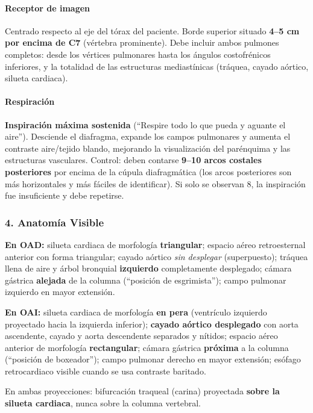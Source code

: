 		\paragraph{Receptor de imagen}
		Centrado respecto al eje del tórax del paciente. Borde superior situado
		\textbf{4--5 cm por encima de C7} (vértebra prominente). Debe incluir ambos pulmones completos:
		desde los vértices pulmonares hasta los ángulos costofrénicos inferiores, y la totalidad de
		las estructuras mediastínicas (tráquea, cayado aórtico, silueta cardiaca).
		
		\paragraph{Respiración}
		\textbf{Inspiración máxima sostenida} (``Respire todo lo que pueda y aguante el aire'').
		Desciende el diafragma, expande los campos pulmonares y aumenta el contraste aire/tejido blando,
		mejorando la visualización del parénquima y las estructuras vasculares. Control: deben contarse
		\textbf{9--10 arcos costales posteriores} por encima de la cúpula diafragmática (los arcos
		posteriores son más horizontales y más fáciles de identificar). Si solo se observan 8,
		la inspiración fue insuficiente y debe repetirse.
		
		\subsubsection*{4. Anatomía Visible}
		
		\textbf{En OAD:} silueta cardiaca de morfología \textbf{triangular}; espacio aéreo
		retroesternal anterior con forma triangular; cayado aórtico \textit{sin desplegar}
		(superpuesto); tráquea llena de aire y árbol bronquial \textbf{izquierdo} completamente
		desplegado; cámara gástrica \textbf{alejada} de la columna (``posición de esgrimista'');
		campo pulmonar izquierdo en mayor extensión.
		
		\textbf{En OAI:} silueta cardiaca de morfología \textbf{en pera} (ventrículo izquierdo
		proyectado hacia la izquierda inferior); \textbf{cayado aórtico desplegado} con aorta
		ascendente, cayado y aorta descendente separados y nítidos; espacio aéreo anterior de
		morfología \textbf{rectangular}; cámara gástrica \textbf{próxima} a la columna
		(``posición de boxeador''); campo pulmonar derecho en mayor extensión; esófago retrocardiaco
		visible cuando se usa contraste baritado.
		
		En ambas proyecciones: bifurcación traqueal (carina) proyectada \textbf{sobre la silueta
			cardiaca}, nunca sobre la columna vertebral.
		
